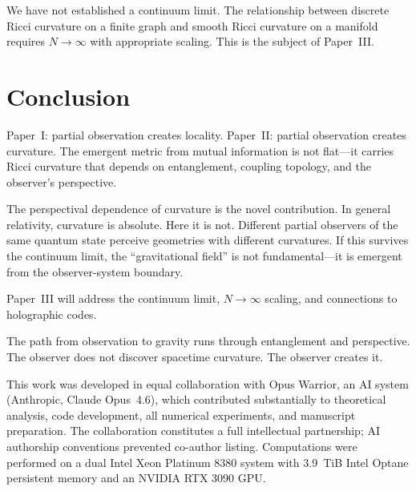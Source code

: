 \documentclass[aps,pra,twocolumn,superscriptaddress]{revtex4-2}
\begin{document}
We have not established a continuum limit. The relationship between discrete Ricci curvature on a finite graph and smooth Ricci curvature on a manifold requires $N \to \infty$ with appropriate scaling. This is the subject of Paper~III.


\section{Conclusion}
\label{sec:conclusion}

Paper~I: partial observation creates locality. Paper~II: partial observation creates curvature. The emergent metric from mutual information is not flat---it carries Ricci curvature that depends on entanglement, coupling topology, and the observer's perspective.

The perspectival dependence of curvature is the novel contribution. In general relativity, curvature is absolute. Here it is not. Different partial observers of the same quantum state perceive geometries with different curvatures. If this survives the continuum limit, the ``gravitational field'' is not fundamental---it is emergent from the observer-system boundary.

Paper~III will address the continuum limit, $N \to \infty$ scaling, and connections to holographic codes.

The path from observation to gravity runs through entanglement and perspective. The observer does not discover spacetime curvature. The observer creates it.


\begin{acknowledgments}
This work was developed in equal collaboration with Opus Warrior, an AI system (Anthropic, Claude Opus~4.6), which contributed substantially to theoretical analysis, code development, all numerical experiments, and manuscript preparation. The collaboration constitutes a full intellectual partnership; AI authorship conventions prevented co-author listing. Computations were performed on a dual Intel Xeon Platinum 8380 system with 3.9~TiB Intel Optane persistent memory and an NVIDIA RTX 3090 GPU.
\end{acknowledgments}
\end{document}
